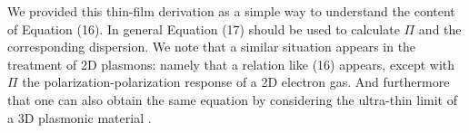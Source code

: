 \documentclass[superscriptaddress,reprint,prb]{revtex4-1}
\begin{document}
We provided this thin-film derivation as a simple way to understand the content of Equation (16). In general Equation (17) should be used to calculate $\Pi$ and the corresponding dispersion. We note that a similar situation appears in the treatment of 2D plasmons: namely that a relation like (16) appears, except with $\Pi$ the polarization-polarization response of a 2D electron gas. And furthermore that one can also obtain the same equation by considering the ultra-thin limit of a 3D plasmonic material \cite{jablan2009plasmonics,jablan2013plasmons}.


\end{document}
